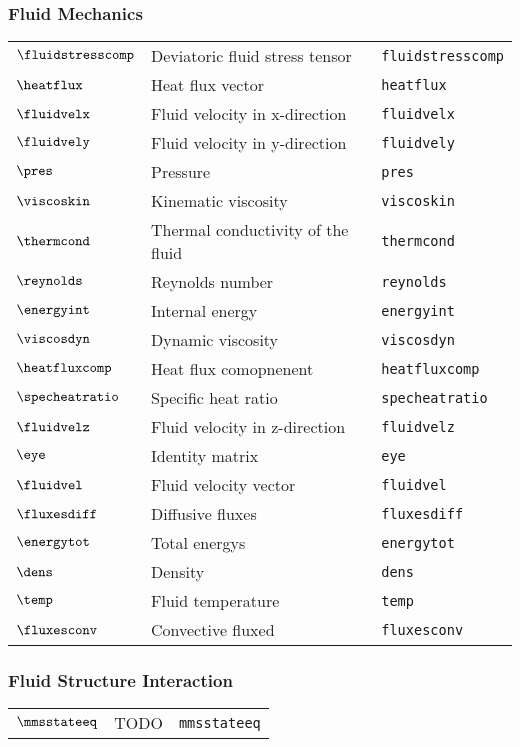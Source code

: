 \subsubsection*{Fluid Mechanics}
\begin{tabular}{l l l}
$\fluidstresscomp$ & Deviatoric fluid stress tensor& \texttt{fluidstresscomp}\\
$\heatflux$ & Heat flux vector& \texttt{heatflux}\\
$\fluidvelx$ & Fluid velocity in x-direction& \texttt{fluidvelx}\\
$\fluidvely$ & Fluid velocity in y-direction& \texttt{fluidvely}\\
$\pres$ & Pressure& \texttt{pres}\\
$\viscoskin$ & Kinematic viscosity& \texttt{viscoskin}\\
$\thermcond$ & Thermal conductivity of the fluid& \texttt{thermcond}\\
$\reynolds$ & Reynolds number& \texttt{reynolds}\\
$\energyint$ & Internal energy& \texttt{energyint}\\
$\viscosdyn$ & Dynamic viscosity& \texttt{viscosdyn}\\
$\heatfluxcomp$ & Heat flux comopnenent& \texttt{heatfluxcomp}\\
$\specheatratio$ & Specific heat ratio& \texttt{specheatratio}\\
$\fluidvelz$ & Fluid velocity in z-direction& \texttt{fluidvelz}\\
$\eye$ & Identity matrix& \texttt{eye}\\
$\fluidvel$ & Fluid velocity vector& \texttt{fluidvel}\\
$\fluxesdiff$ & Diffusive fluxes& \texttt{fluxesdiff}\\
$\energytot$ & Total energys& \texttt{energytot}\\
$\dens$ & Density& \texttt{dens}\\
$\temp$ & Fluid temperature& \texttt{temp}\\
$\fluxesconv$ & Convective fluxed& \texttt{fluxesconv}\\
\end{tabular}

\subsubsection*{Fluid Structure Interaction}
\begin{tabular}{l l l}
$\mmsstateeq$ & TODO& \texttt{mmsstateeq}\\
\end{tabular}

